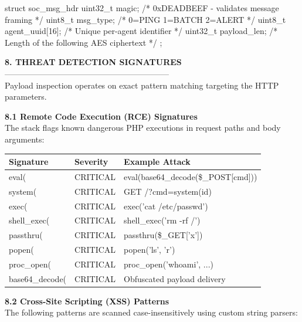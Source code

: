 \documentclass[12pt,a4paper]{article}
\newcommand{\thfmt}[1]{\textbf{#1}}
\begin{document}
\begin{codeblock}
struct soc_msg_hdr {
    uint32_t magic;           /* 0xDEADBEEF - validates message framing     */
    uint8_t  msg_type;        /* 0=PING  1=BATCH  2=ALERT                   */
    uint8_t  agent_uuid[16];  /* Unique per-agent identifier                */
    uint32_t payload_len;     /* Length of the following AES ciphertext     */
};
\end{codeblock}

\vspace{1.5em}
\textbf{8. THREAT DETECTION SIGNATURES}\\
------------------------------------------------------------\\
Payload inspection operates on exact pattern matching targeting the HTTP parameters.

\textbf{8.1 Remote Code Execution (RCE) Signatures}\\
The stack flags known dangerous PHP executions in request paths and body arguments:

\begin{center}
\begin{tabular}{L{3.5cm} C{3cm} L{7.9cm}}
\hline
\thfmt{Signature} & \thfmt{Severity} & \thfmt{Example Attack} \\
\hline
eval(           & CRITICAL & eval(base64\_decode(\$\_POST[cmd])) \\
system(         & CRITICAL & GET /?cmd=system(id) \\
exec(           & CRITICAL & exec('cat /etc/passwd') \\
shell\_exec(    & CRITICAL & shell\_exec('rm -rf /') \\
passthru(       & CRITICAL & passthru(\$\_GET['x']) \\
popen(          & CRITICAL & popen('ls', 'r') \\
proc\_open(     & CRITICAL & proc\_open('whoami', ...) \\
base64\_decode( & CRITICAL & Obfuscated payload delivery \\
\hline
\end{tabular}
\end{center}

\textbf{8.2 Cross-Site Scripting (XSS) Patterns}\\
The following patterns are scanned case-insensitively using custom string parsers:
\end{document}
